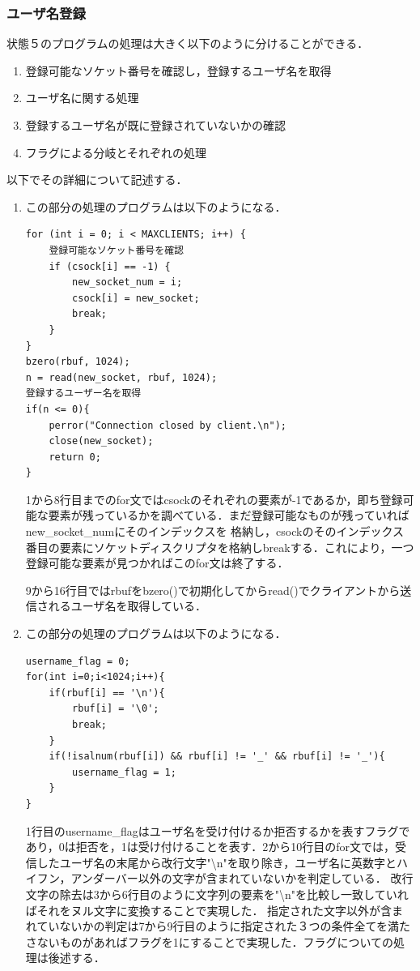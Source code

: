 \documentclass[dvipdfmx]{jarticle}
\begin{document}
\subsubsection{ユーザ名登録}
状態５のプログラムの処理は大きく以下のように分けることができる．
\begin{enumerate}
    \item 登録可能なソケット番号を確認し，登録するユーザ名を取得
    \item ユーザ名に関する処理
    \item 登録するユーザ名が既に登録されていないかの確認
    \item フラグによる分岐とそれぞれの処理
\end{enumerate}
以下でその詳細について記述する．
\begin{enumerate}
    \item この部分の処理のプログラムは以下のようになる．
    \begin{lstlisting}
for (int i = 0; i < MAXCLIENTS; i++) {
    登録可能なソケット番号を確認
    if (csock[i] == -1) {
        new_socket_num = i;
        csock[i] = new_socket;
        break;
    }
}
bzero(rbuf, 1024);
n = read(new_socket, rbuf, 1024);
登録するユーザー名を取得
if(n <= 0){
    perror("Connection closed by client.\n");
    close(new_socket);
    return 0;
}
    \end{lstlisting}
    1から8行目までのfor文ではcsockのそれぞれの要素が-1であるか，即ち登録可能な要素が残っているかを調べている．まだ登録可能なものが残っていればnew\_socket\_numにそのインデックスを
    格納し，csockのそのインデックス番目の要素にソケットディスクリプタを格納しbreakする．これにより，一つ登録可能な要素が見つかればこのfor文は終了する．

    9から16行目ではrbufをbzero()で初期化してからread()でクライアントから送信されるユーザ名を取得している．
    \item この部分の処理のプログラムは以下のようになる．
    \begin{lstlisting}
username_flag = 0;
for(int i=0;i<1024;i++){
    if(rbuf[i] == '\n'){
        rbuf[i] = '\0';
        break;
    }
    if(!isalnum(rbuf[i]) && rbuf[i] != '_' && rbuf[i] != '_'){
        username_flag = 1;
    }
}
    \end{lstlisting}
    1行目のusername\_flagはユーザ名を受け付けるか拒否するかを表すフラグであり，0は拒否を，1は受け付けることを表す．2から10行目のfor文では，受信したユーザ名の末尾から改行文字"\textbackslash n"を取り除き，ユーザ名に英数字とハイフン，アンダーバー以外の文字が含まれていないかを判定している．
    改行文字の除去は3から6行目のように文字列の要素を"\textbackslash n"を比較し一致していればそれをヌル文字に変換することで実現した．
    指定された文字以外が含まれていないかの判定は7から9行目のように指定された３つの条件全てを満たさないものがあればフラグを1にすることで実現した．フラグについての処理は後述する．


\end{enumerate}
\end{document}
